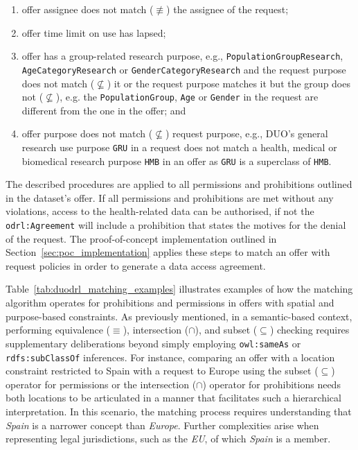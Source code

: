 \begin{enumerate}
    \item offer assignee does not match ($\not\equiv$) the assignee of the request; 
    \item offer time limit on use has lapsed;
    \item offer has a group-related research purpose, e.g., \texttt{PopulationGroupResearch}, \texttt{AgeCategoryResearch} or \texttt{GenderCategoryResearch} and the request purpose does not match ($\not\subseteq$) it or the request purpose matches it but the group does not ($\not\subseteq$), e.g. the \texttt{PopulationGroup}, \texttt{Age} or \texttt{Gender} in the request are different from the one in the offer; and
    \item offer purpose does not match ($\not\subseteq$) request purpose, e.g., DUO's general research use purpose \texttt{GRU} in a request does not match a health, medical or biomedical research purpose \texttt{HMB} in an offer as \texttt{GRU} is a superclass of \texttt{HMB}.
\end{enumerate}

The described procedures are applied to all permissions and prohibitions outlined in the dataset's offer.
If all permissions and prohibitions are met without any violations, access to the health-related data can be authorised, if not the \texttt{odrl:Agreement} will include a prohibition that states the motives for the denial of the request.
The proof-of-concept implementation outlined in Section~\ref{sec:poc_implementation} applies these steps to match an offer with request policies in order to generate a data access agreement.

Table~\ref{tab:duodrl_matching_examples} illustrates examples of how the matching algorithm operates for prohibitions and permissions in offers with spatial and purpose-based constraints.
As previously mentioned, in a semantic-based context, performing equivalence ($\equiv$), intersection ($\cap$), and subset ($\subseteq$) checking requires supplementary deliberations beyond simply employing \texttt{owl:sameAs} or \texttt{rdfs:subClassOf} inferences.
For instance, comparing an offer with a location constraint restricted to Spain with a request to Europe using the subset ($\subseteq$) operator for permissions or the intersection ($\cap$) operator for prohibitions needs both locations to be articulated in a manner that facilitates such a hierarchical interpretation.
In this scenario, the matching process requires understanding that \textit{Spain} is a narrower concept than \textit{Europe}.
Further complexities arise when representing legal jurisdictions, such as the \textit{EU}, of which \textit{Spain} is a member.

